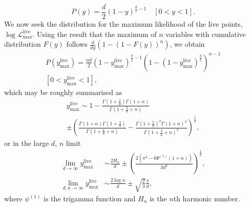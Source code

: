 \documentclass[usenatbib]{mnras}
\begin{document}
\begin{equation}
    P(y) = \frac{d}{2}(1-y)^{\frac{d}{2}-1} \quad [0<y<1].
    \label{eq:Py}
\end{equation}
We now seek the distribution for the maximum likelihood of the live points, $\log\mathcal{L}_\mathrm{max}^{\mathrm{live}}$. Using the result that the maximum of $n$ variables with cumulative distribution $F(y)$ follows $\frac{d}{dy}( 1- (1-F(y))^n)$, we obtain
\begin{multline}
    P(y_\mathrm{max}^\mathrm{live}) = \frac{nd}{2}(1-y_\mathrm{max}^\mathrm{live})^{\frac{d}{2}-1}\left(1-(1-y_\mathrm{max}^\mathrm{live})^{\frac{d}{2}}\right)^{n-1}\\ 
    [0<y_\mathrm{max}^\mathrm{live}<1],
    \label{eq:Pyhat}
\end{multline}
which may be roughly summarised as
\begin{multline}
    y_\mathrm{max}^\mathrm{live} \sim 1-\frac{\Gamma(1+\frac{2}{d})\Gamma(1+n)}{\Gamma(1+\frac{2}{d}+n)} \\
     \pm \left( \frac{\Gamma(1+n)\Gamma(1+\frac{4}{d})}{\Gamma(1+\frac{4}{d}+n)} - \frac{\Gamma(1+\frac{2}{d})^2 \Gamma(1+n)^2}{\Gamma(1+\frac{2}{d}+n)^2}\right)^{\frac{1}{2}},
    \label{eq:ymax}
\end{multline}
or in the large $d$, $n$ limit
\begin{align}
    \lim_{d\to\infty} y_\mathrm{max}^\mathrm{live} &\sim \frac{2H_n}{d} \pm \left(\frac{2(\pi^2 - 6\Psi^{(1)}(1+n))}{3d^2}\right)^{\frac{1}{2}},
    \label{eq:ymaxd}\\
    \lim_{d,n\to\infty} y_\mathrm{max}^\mathrm{live} &\sim \frac{2\log n}{d} \pm \sqrt{\frac{2}{3}}\frac{\pi}{d},
    \label{eq:ymaxdn}
\end{align}
where $\psi^{(1)}$ is the trigamma function and $H_n$ is the $n$th harmonic number.
\end{document}
